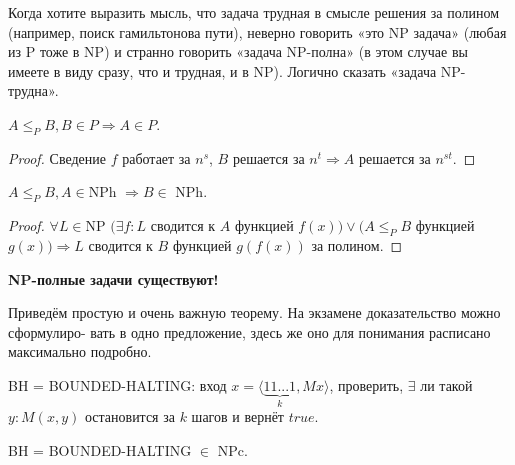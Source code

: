 \begin{remark}
    Когда хотите выразить мысль, что задача трудная в смысле решения за полином (например, поиск гамильтонова пути), неверно говорить «это NP задача» (любая из P тоже в NP) и странно говорить «задача NP-полна» (в этом случае вы имеете в виду сразу, что и трудная, и в NP). Логично сказать «задача NP-трудна».
\end{remark}

\begin{lemma}
    $A\leq_P B, B\in P\Rightarrow A\in P$.
\end{lemma}

\begin{proof}
    Сведение $f$ работает за $n^s$, $B$ решается за $n^t\Rightarrow A$ решается за $n^{st}$.
\end{proof}

\begin{lemma}
    $A\leq_P B, A\in $NPh $\Rightarrow B\in $ NPh.
\end{lemma}

\begin{proof}
    $\forall L \in $NP $(\exists f: L$ сводится к $A$ функцией $f(x))\vee (A\leq_P B$ функцией $g(x))\Rightarrow L$ сводится к $B$ функцией $g(f(x))$ за полином.
\end{proof}

\textbf{NP-полные задачи существуют!}

Приведём простую и очень важную теорему. На экзамене доказательство можно сформулиро- вать в одно предложение, здесь же оно для понимания расписано максимально подробно.

\begin{definition}
    BH = BOUNDED-HALTING: вход $x = \langle \underbrace{11...1}_{k}, M x\rangle$, проверить, $\exists$ ли такой $y : M(x,y)$ остановится за $k$ шагов и вернёт $true$.
\end{definition}

\begin{theorem}
    BH = BOUNDED-HALTING $\in$ NPc.
\end{theorem}

